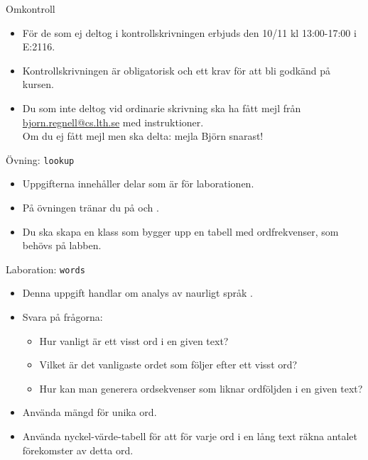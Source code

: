 

\ifkompendium\else
\begin{Slide}{Omkontroll}
\begin{itemize}
\item För de som ej deltog i kontrollskrivningen erbjuds  den 10/11 kl 13:00-17:00 i E:2116. 
\item Kontrollskrivningen är obligatorisk och ett krav för att bli godkänd på kursen.
\item Du som inte deltog vid ordinarie skrivning ska ha fått mejl från \url{bjorn.regnell@cs.lth.se} med instruktioner.\\Om du ej fått mejl men ska delta: mejla Björn snarast!
\end{itemize}  
\end{Slide}
\fi


\begin{Slide}{Övning: \texttt{lookup}}
\begin{itemize}
  \item Uppgifterna innehåller delar som är  för laborationen.
  \item På övningen tränar du på  och .
  \item Du ska skapa en klass  som bygger upp en tabell med ordfrekvenser, som behövs på labben.
\end{itemize}
\end{Slide}

\begin{Slide}{Laboration: \texttt{words}}
\begin{itemize}
  \item Denna uppgift handlar om analys av naurligt språk .
  \item Svara på frågorna:
  \begin{itemize}%
  \item Hur vanligt är ett visst ord i en given text?
  \item Vilket är det vanligaste ordet som följer efter ett visst ord?
  \item Hur kan man generera ordsekvenser som liknar ordföljden i en given text?
  \end{itemize}
\item Använda mängd för unika ord.
\item Använda nyckel-värde-tabell för att för varje ord i en lång text räkna antalet förekomster av detta ord.
\end{itemize}
\end{Slide}


